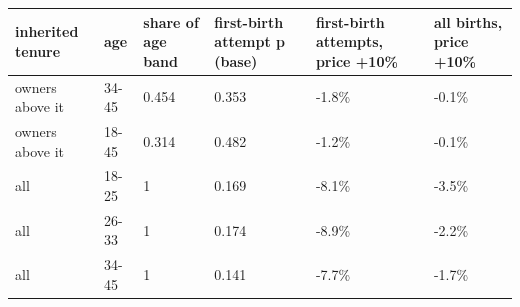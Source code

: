 \begingroup\small
\setlength{\tabcolsep}{3pt}
\renewcommand{\arraystretch}{1.04}
\begin{tabularx}{\linewidth}{XXXXXX}
\toprule
inherited tenure & age & share of age band & first-birth attempt p (base) & first-birth attempts, price +10\% & all births, price +10\% \\
\midrule
owners above it & 34-45 & 0.454 & 0.353 & -1.8\% & -0.1\% \\
owners above it & 18-45 & 0.314 & 0.482 & -1.2\% & -0.1\% \\
all & 18-25 & 1 & 0.169 & -8.1\% & -3.5\% \\
all & 26-33 & 1 & 0.174 & -8.9\% & -2.2\% \\
all & 34-45 & 1 & 0.141 & -7.7\% & -1.7\% \\
\bottomrule
\end{tabularx}
\endgroup
